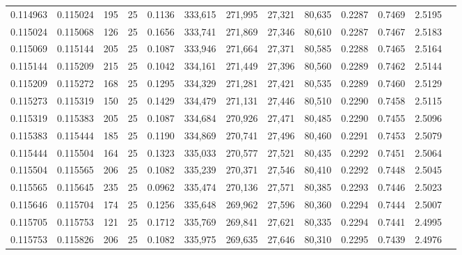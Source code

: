 \begin{tabular}{rrrrrrrrrrrrr}
0.114963 & 0.115024 &   195 &  25 &                                     0.1136 & 333,615 & 271,995 &  27,321 &  80,635 & 0.2287 & 0.7469 & 2.5195 \\
0.115024 & 0.115068 &   126 &  25 &                                     0.1656 & 333,741 & 271,869 &  27,346 &  80,610 & 0.2287 & 0.7467 & 2.5183 \\
0.115069 & 0.115144 &   205 &  25 &                                     0.1087 & 333,946 & 271,664 &  27,371 &  80,585 & 0.2288 & 0.7465 & 2.5164 \\
0.115144 & 0.115209 &   215 &  25 &                                     0.1042 & 334,161 & 271,449 &  27,396 &  80,560 & 0.2289 & 0.7462 & 2.5144 \\
0.115209 & 0.115272 &   168 &  25 &                                     0.1295 & 334,329 & 271,281 &  27,421 &  80,535 & 0.2289 & 0.7460 & 2.5129 \\
0.115273 & 0.115319 &   150 &  25 &                                     0.1429 & 334,479 & 271,131 &  27,446 &  80,510 & 0.2290 & 0.7458 & 2.5115 \\
0.115319 & 0.115383 &   205 &  25 &                                     0.1087 & 334,684 & 270,926 &  27,471 &  80,485 & 0.2290 & 0.7455 & 2.5096 \\
0.115383 & 0.115444 &   185 &  25 &                                     0.1190 & 334,869 & 270,741 &  27,496 &  80,460 & 0.2291 & 0.7453 & 2.5079 \\
0.115444 & 0.115504 &   164 &  25 &                                     0.1323 & 335,033 & 270,577 &  27,521 &  80,435 & 0.2292 & 0.7451 & 2.5064 \\
0.115504 & 0.115565 &   206 &  25 &                                     0.1082 & 335,239 & 270,371 &  27,546 &  80,410 & 0.2292 & 0.7448 & 2.5045 \\
0.115565 & 0.115645 &   235 &  25 &                                     0.0962 & 335,474 & 270,136 &  27,571 &  80,385 & 0.2293 & 0.7446 & 2.5023 \\
0.115646 & 0.115704 &   174 &  25 &                                     0.1256 & 335,648 & 269,962 &  27,596 &  80,360 & 0.2294 & 0.7444 & 2.5007 \\
0.115705 & 0.115753 &   121 &  25 &                                     0.1712 & 335,769 & 269,841 &  27,621 &  80,335 & 0.2294 & 0.7441 & 2.4995 \\
0.115753 & 0.115826 &   206 &  25 &                                     0.1082 & 335,975 & 269,635 &  27,646 &  80,310 & 0.2295 & 0.7439 & 2.4976 \\

\end{tabular}
